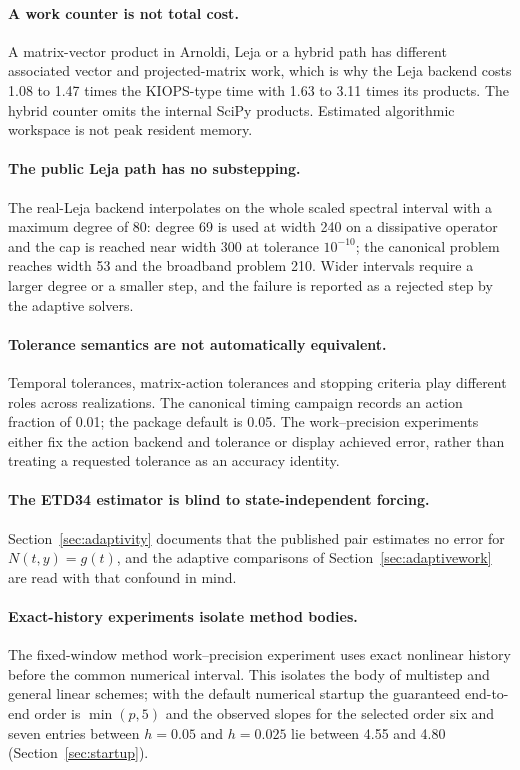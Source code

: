 \paragraph{A work counter is not total cost.}
A matrix-vector product in Arnoldi, Leja or a hybrid path has different
associated vector and projected-matrix work, which is why the Leja backend
costs 1.08 to 1.47 times the KIOPS-type time with 1.63 to 3.11 times its
products.  The hybrid counter omits the internal SciPy products.  Estimated
algorithmic workspace is not peak resident memory.

\paragraph{The public Leja path has no substepping.}
The real-Leja backend interpolates on the whole scaled spectral interval with
a maximum degree of 80: degree 69 is used at width 240 on a dissipative
operator and the cap is reached near width 300 at tolerance $10^{-10}$; the
canonical problem reaches width 53 and the broadband problem 210.  Wider
intervals require a larger degree or a smaller step, and the failure is
reported as a rejected step by the adaptive solvers.

\paragraph{Tolerance semantics are not automatically equivalent.}
Temporal tolerances, matrix-action tolerances and stopping criteria play
different roles across realizations.  The canonical timing campaign records an
action fraction of 0.01; the package default is 0.05.  The work--precision
experiments either fix the action backend and tolerance or display achieved
error, rather than treating a requested tolerance as an accuracy identity.

\paragraph{The ETD34 estimator is blind to state-independent forcing.}
Section~\ref{sec:adaptivity} documents that the published pair estimates no
error for $N(t,y)=g(t)$, and the adaptive comparisons of
Section~\ref{sec:adaptivework} are read with that confound in mind.

\paragraph{Exact-history experiments isolate method bodies.}
The fixed-window method work--precision experiment uses exact nonlinear
history before the common numerical interval.  This isolates the body of
multistep and general linear schemes; with the default numerical startup the
guaranteed end-to-end order is $\min(p,5)$ and the observed slopes for the selected
order six and seven entries between $h=0.05$ and $h=0.025$ lie between
4.55 and 4.80
(Section~\ref{sec:startup}).

